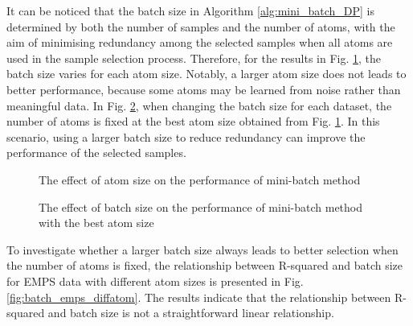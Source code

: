 \documentclass{article}
\begin{document}
It can be noticed that the batch size in Algorithm \ref{alg:mini_batch_DP} is determined by both the number of samples and the number of atoms, with the aim of minimising redundancy among the selected samples when all atoms are used in the sample selection process. 
Therefore, for the results in Fig. \ref{fig:atom_three}, the batch size varies for each atom size. 
Notably, a larger atom size does not leads to better performance, because some atoms may be learned from noise rather than meaningful data.
In Fig. \ref{fig:batch_three}, when changing the batch size for each dataset, the number of atoms is fixed at the best atom size obtained from Fig. \ref{fig:atom_three}. In this scenario, using a larger batch size to reduce redundancy can improve the performance of the selected samples.

\begin{figure} [htbp]
\centering
    \caption{The effect of atom size on the performance of mini-batch method}\label{fig:atom_three}
\end{figure}

\begin{figure} [htbp]
\centering
    \caption{The effect of batch size on the performance of mini-batch method with the best atom size}\label{fig:batch_three}
\end{figure}

To investigate whether a larger batch size always leads to better selection when the number of atoms is fixed, the relationship between R-squared and batch size for EMPS data with different atom sizes is presented in Fig. \ref{fig:batch_emps_diffatom}. 
The results indicate that the relationship between R-squared and batch size is not a straightforward linear relationship. 
\end{document}

